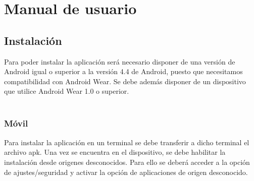 \chapter{Manual de usuario}

\section{Instalación}

Para poder instalar la aplicación será necesario disponer de una versión de Android igual o superior a la versión 4.4 de Android, puesto que necesitamos compatibilidad con Android Wear. Se debe además disponer de un dispositivo que utilice Android Wear 1.0 o superior.\\
\\
\subsection*{Móvil}
Para instalar la aplicación en un terminal se debe transferir a dicho terminal el archivo apk. Una vez se encuentra en el dispositivo, se debe habilitar la instalación desde origenes desconocidos. Para ello se deberá acceder a la opción de ajustes/seguridad y activar la opción de aplicaciones de origen desconocido.

